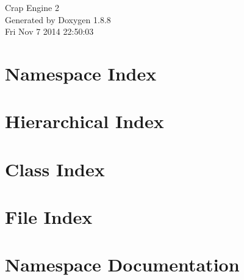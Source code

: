\documentclass[twoside]{book}
\newcommand{\+}{\discretionary{\mbox{\scriptsize$\hookleftarrow$}}{}{}}
\newcommand{\clearemptydoublepage}{%
  \newpage{\pagestyle{empty}\cleardoublepage}%
}
\begin{document}
\hypersetup{pageanchor=false,
             bookmarks=true,
             bookmarksnumbered=true,
             pdfencoding=unicode
            }
\begin{titlepage}
\vspace*{7cm}
\begin{center}%
{\Large Crap Engine 2 }\\
\vspace*{1cm}
{\large Generated by Doxygen 1.8.8}\\
\vspace*{0.5cm}
{\small Fri Nov 7 2014 22:50:03}\\
\end{center}
\end{titlepage}
\clearemptydoublepage
\tableofcontents
\clearemptydoublepage
{}
\hypersetup{pageanchor=true}

\chapter{Namespace Index}

\chapter{Hierarchical Index}

\chapter{Class Index}

\chapter{File Index}

\chapter{Namespace Documentation}






\end{document}
